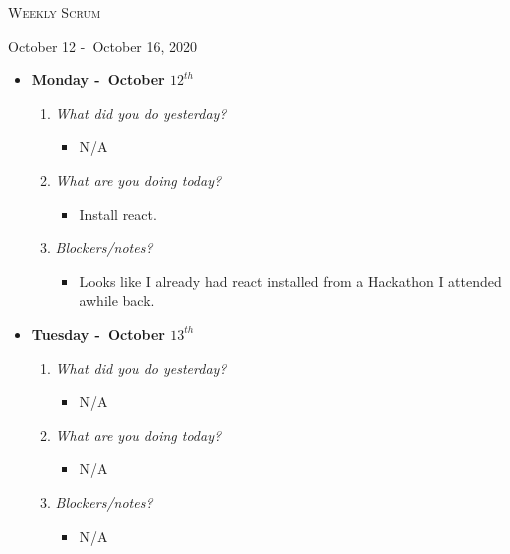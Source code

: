 \centerline{\LARGE\textsc{Weekly Scrum}}
\centerline{October 12 -\ October 16, 2020}
\textbf{}
\begin{itemize}
  \item[] \textbf{\large Monday -\ October \(12^{th}\)}
  \begin{enumerate}
    \item \textsl{What did you do yesterday?}
    \begin{itemize}
      \item N/A
    \end{itemize}
    \item \textsl{What are you doing today?}
    \begin{itemize}
      \item Install react.
    \end{itemize}
    \item \textsl{Blockers/notes?}
    \begin{itemize}
      \item Looks like I already had react installed from a Hackathon I attended awhile back.
    \end{itemize}
  \end{enumerate}
\end{itemize}
\textbf{}
\begin{itemize}
  \item[] \textbf{\large Tuesday -\ October \(13^{th}\)}
  \begin{enumerate}
    \item \textsl{What did you do yesterday?}
    \begin{itemize}
      \item N/A
    \end{itemize}
    \item \textsl{What are you doing today?}
    \begin{itemize}
      \item N/A
    \end{itemize}
    \item \textsl{Blockers/notes?}
    \begin{itemize}
      \item N/A
    \end{itemize}
  \end{enumerate}
\end{itemize}
\textbf{}
